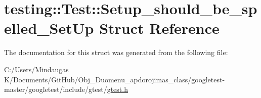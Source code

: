 \hypertarget{structtesting_1_1_test_1_1_setup__should__be__spelled___set_up}{}\section{testing\+::Test\+::Setup\+\_\+should\+\_\+be\+\_\+spelled\+\_\+\+Set\+Up Struct Reference}
\label{structtesting_1_1_test_1_1_setup__should__be__spelled___set_up}


The documentation for this struct was generated from the following file\+:\begin{DoxyCompactItemize}
\item 
C\+:/\+Users/\+Mindaugas K/\+Documents/\+Git\+Hub/\+Obj\+\_\+\+Duomenu\+\_\+apdorojimas\+\_\+class/googletest-\/master/googletest/include/gtest/\mbox{\hyperlink{googletest-master_2googletest_2include_2gtest_2gtest_8h}{gtest.\+h}}\end{DoxyCompactItemize}
